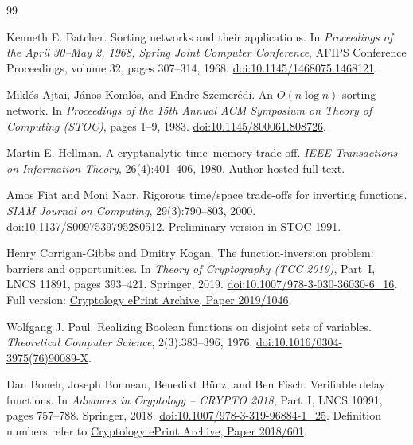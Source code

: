 \documentclass[11pt]{article}
\theoremstyle{definition}
\theoremstyle{remark}
\numberwithin{equation}{section}
\begin{document}
\begin{thebibliography}{99}

Kenneth E. Batcher.
\newblock Sorting networks and their applications.
\newblock In \emph{Proceedings of the April 30--May 2, 1968, Spring Joint
Computer Conference}, AFIPS Conference Proceedings, volume 32,
pages 307--314, 1968.
\newblock \href{https://doi.org/10.1145/1468075.1468121}{doi:10.1145/1468075.1468121}.

Mikl\'os Ajtai, J\'anos Koml\'os, and Endre Szemer\'edi.
\newblock An $O(n\log n)$ sorting network.
\newblock In \emph{Proceedings of the 15th Annual ACM Symposium on Theory
of Computing (STOC)}, pages 1--9, 1983.
\newblock \href{https://doi.org/10.1145/800061.808726}{doi:10.1145/800061.808726}.

Martin E. Hellman.
\newblock A cryptanalytic time--memory trade-off.
\newblock \emph{IEEE Transactions on Information Theory}, 26(4):401--406, 1980.
\newblock \href{https://ee.stanford.edu/~hellman/publications/36.pdf}{Author-hosted full text}.

Amos Fiat and Moni Naor.
\newblock Rigorous time/space trade-offs for inverting functions.
\newblock \emph{SIAM Journal on Computing}, 29(3):790--803, 2000.
\newblock \href{https://doi.org/10.1137/S0097539795280512}{doi:10.1137/S0097539795280512}.
\newblock Preliminary version in STOC 1991.

Henry Corrigan-Gibbs and Dmitry Kogan.
\newblock The function-inversion problem: barriers and opportunities.
\newblock In \emph{Theory of Cryptography (TCC 2019)}, Part~I, LNCS 11891,
pages 393--421. Springer, 2019.
\newblock \href{https://doi.org/10.1007/978-3-030-36030-6_16}{doi:10.1007/978-3-030-36030-6\_16}.
\newblock Full version: \href{https://eprint.iacr.org/2019/1046}{Cryptology ePrint Archive, Paper 2019/1046}.

Wolfgang J. Paul.
\newblock Realizing {Boolean} functions on disjoint sets of variables.
\newblock \emph{Theoretical Computer Science}, 2(3):383--396, 1976.
\newblock \href{https://doi.org/10.1016/0304-3975(76)90089-X}{doi:10.1016/0304-3975(76)90089-X}.

Dan Boneh, Joseph Bonneau, Benedikt B\"unz, and Ben Fisch.
\newblock Verifiable delay functions.
\newblock In \emph{Advances in Cryptology -- CRYPTO 2018}, Part~I, LNCS 10991,
pages 757--788. Springer, 2018.
\newblock \href{https://doi.org/10.1007/978-3-319-96884-1_25}{doi:10.1007/978-3-319-96884-1\_25}.
\newblock Definition numbers refer to
\href{https://eprint.iacr.org/2018/601}{Cryptology ePrint Archive, Paper 2018/601}.


\end{thebibliography}
\end{document}
